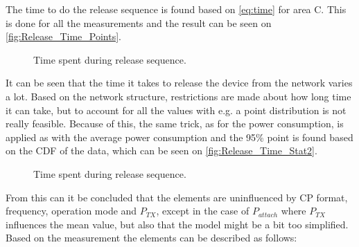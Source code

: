 The time to do the release sequence is found based on \autoref{eq:time} for area C. This is done for all the measurements and the result can be seen on \autoref{fig:Release_Time_Points}. 

\begin{figure}[H]
\centering
\begin{minipage}{0.48\textwidth}
\resizebox{\textwidth}{!}{
}
\end{minipage}
\hfill
\begin{minipage}{0.48\textwidth}
\resizebox{\textwidth}{!}{
}
\end{minipage}
\caption{Time spent during release sequence.}
\label{fig:Release_Time_Points}
\end{figure}

It can be seen that the time it takes to release the device from the network varies a lot. Based on the network structure, restrictions are made about how long time it can take, but to account for all the values with e.g. a point distribution is not really feasible. Because of this, the same trick, as for the power consumption, is applied as with the average power consumption and the 95\% point is found based on the CDF of the data, which can be seen on \autoref{fig:Release_Time_Stat2}.

\begin{figure}[H]
\centering
\begin{minipage}{0.48\textwidth}
\resizebox{\textwidth}{!}{
}
\end{minipage}
\caption{Time spent during release sequence.}
\label{fig:Release_Time_Stat2}
\end{figure}

From this can it be concluded that the elements are uninfluenced by CP format, frequency, operation mode and $P_{TX}$, except in the case of $P_{attach}$ where $P_{TX}$ influences the mean value, but also that the model might be a bit too simplified. Based on the measurement the elements can be described as follows:

